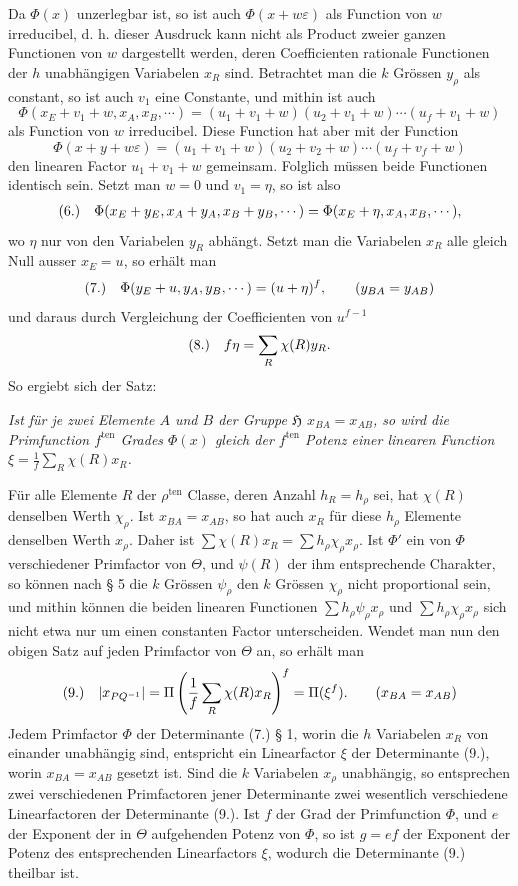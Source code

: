\documentclass[11pt]{article}
\makeatletter
\newcommand{\Hgrp}{\mathfrak{H}}
\newcommand{\frobtagc}[2]{\[\begin{array}{@{}r@{\quad}c@{}}\textup{(#1)} & \displaystyle #2\end{array}\]}
\makeatother
\begin{document}
Da $\Phi(x)$ unzerlegbar ist, so ist auch $\Phi(x+w\varepsilon)$ als Function von $w$ irreducibel, d. h. dieser Ausdruck kann nicht als Product zweier ganzen Functionen von $w$ dargestellt werden, deren Coefficienten rationale Functionen der $h$ unabhängigen Variabelen $x_R$ sind. Betrachtet man die $k$ Grössen $y_\rho$ als constant, so ist auch $v_1$ eine Constante, und mithin ist auch
\[
\Phi(x_E+v_1+w,x_A,x_B,\cdots)=(u_1+v_1+w)(u_2+v_1+w)\cdots(u_f+v_1+w)
\]
als Function von $w$ irreducibel. Diese Function hat aber mit der Function
\[
\Phi(x+y+w\varepsilon)=(u_1+v_1+w)(u_2+v_2+w)\cdots(u_f+v_f+w)
\]
den linearen Factor $u_1+v_1+w$ gemeinsam. Folglich müssen beide Functionen identisch sein. Setzt man $w=0$ und $v_1=\eta$, so ist also
\frobtagc{6.}{\Phi(x_E+y_E,x_A+y_A,x_B+y_B,\cdots)=\Phi(x_E+\eta,x_A,x_B,\cdots),}
wo $\eta$ nur von den Variabelen $y_R$ abhängt. Setzt man die Variabelen $x_R$ alle gleich Null ausser $x_E=u$, so erhält man
\frobtagc{7.}{\Phi(y_E+u,y_A,y_B,\cdots)=(u+\eta)^f,\qquad(y_{BA}=y_{AB})}
und daraus durch Vergleichung der Coefficienten von $u^{f-1}$
\frobtagc{8.}{f\eta=\sum_R\chi(R)y_R.}
So ergiebt sich der Satz:

\emph{Ist für je zwei Elemente $A$ und $B$ der Gruppe $\Hgrp$ $x_{BA}=x_{AB}$, so wird die Primfunction $f^{\mathrm{ten}}$ Grades $\Phi(x)$ gleich der $f^{\mathrm{ten}}$ Potenz einer linearen Function $\xi=\frac{1}{f}\sum_R\chi(R)x_R$.}

Für alle Elemente $R$ der $\rho^{\mathrm{ten}}$ Classe, deren Anzahl $h_R=h_\rho$ sei, hat $\chi(R)$ denselben Werth $\chi_\rho$. Ist $x_{BA}=x_{AB}$, so hat auch $x_R$ für diese $h_\rho$ Elemente denselben Werth $x_\rho$. Daher ist $\sum\chi(R)x_R=\sum h_\rho\chi_\rho x_\rho$. Ist $\Phi'$ ein von $\Phi$ verschiedener Primfactor von $\Theta$, und $\psi(R)$ der ihm entsprechende Charakter, so können nach § 5 die $k$ Grössen $\psi_\rho$ den $k$ Grössen $\chi_\rho$ nicht proportional sein, und mithin können die beiden linearen Functionen $\sum h_\rho\psi_\rho x_\rho$ und $\sum h_\rho\chi_\rho x_\rho$ sich nicht etwa nur um einen constanten Factor unterscheiden. Wendet man nun den obigen Satz auf jeden Primfactor von $\Theta$ an, so erhält man
\frobtagc{9.}{|x_{PQ^{-1}}|=\Pi\left(\frac{1}{f}\sum_R\chi(R)x_R\right)^f=\Pi(\xi^f).\qquad(x_{BA}=x_{AB})}
Jedem Primfactor $\Phi$ der Determinante (7.) § 1, worin die $h$ Variabelen $x_R$ von einander unabhängig sind, entspricht ein Linearfactor $\xi$ der Determinante (9.), worin $x_{BA}=x_{AB}$ gesetzt ist. Sind die $k$ Variabelen $x_\rho$ unabhängig, so entsprechen zwei verschiedenen Primfactoren jener Determinante zwei wesentlich verschiedene Linearfactoren der Determinante (9.). Ist $f$ der Grad der Primfunction $\Phi$, und $e$ der Exponent der in $\Theta$ aufgehenden Potenz von $\Phi$, so ist $g=ef$ der Exponent der Potenz des entsprechenden Linearfactors $\xi$, wodurch die Determinante (9.) theilbar ist.
\end{document}
